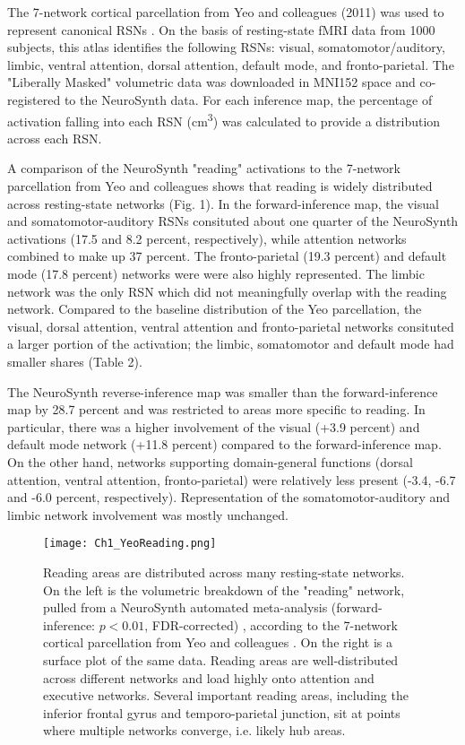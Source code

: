 The 7-network cortical parcellation from Yeo and colleagues (2011) was used to represent canonical RSNs \cite{Yeo2011}. On the basis of resting-state fMRI data from 1000 subjects, this atlas identifies the following RSNs: visual, somatomotor/auditory, limbic, ventral attention, dorsal attention, default mode, and fronto-parietal. The "Liberally Masked" volumetric data was downloaded in MNI152 space and co-registered to the NeuroSynth data. For each inference map, the percentage of activation falling into each RSN (cm\textsuperscript{3}) was calculated to provide a distribution across each RSN.

A comparison of the NeuroSynth "reading" activations to the 7-network parcellation from Yeo and colleagues shows that reading is widely distributed across resting-state networks (Fig. 1). In the forward-inference map, the visual and somatomotor-auditory RSNs consituted about one quarter of the NeuroSynth activations (17.5 and 8.2 percent, respectively), while attention networks combined to make up 37 percent. The fronto-parietal (19.3 percent) and default mode (17.8 percent) networks were were also highly represented. The limbic network was the only RSN which did not meaningfully overlap with the reading network. Compared to the baseline distribution of the Yeo parcellation, the visual, dorsal attention, ventral attention and fronto-parietal networks consituted a larger portion of the activation; the limbic, somatomotor and default mode had smaller shares (Table 2). 

The NeuroSynth reverse-inference map was smaller than the forward-inference map by 28.7 percent and was restricted to areas more specific to reading. In particular, there was a higher involvement of the visual (+3.9 percent) and default mode network (+11.8 percent) compared to the forward-inference map. On the other hand, networks supporting domain-general functions (dorsal attention, ventral attention, fronto-parietal) were relatively less present (-3.4, -6.7 and -6.0 percent, respectively). Representation of the somatomotor-auditory and limbic network involvement was mostly unchanged.

\begin{figure}
\centering
\texttt{[image: Ch1\_YeoReading.png]}
    \caption[Reading areas are distributed across many resting-state networks.]{Reading areas are distributed across many resting-state networks. On the left is the volumetric breakdown of the "reading" network, pulled from a NeuroSynth automated meta-analysis (forward-inference: $p < 0.01$, FDR-corrected) \cite{Yarkoni2011}, according to the 7-network cortical parcellation from Yeo and colleagues \cite{Yeo2011}. On the right is a surface plot of the same data. Reading areas are well-distributed across different networks and load highly onto attention and executive networks. Several important reading areas, including the inferior frontal gyrus and temporo-parietal junction, sit at points where multiple networks converge, i.e. likely hub areas.}
    \label{fig:texlogo}
\end{figure}



